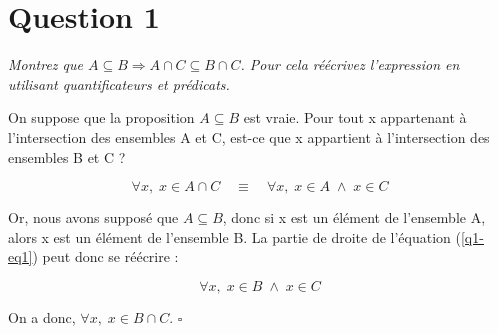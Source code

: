 \section*{Question 1}
\emph{Montrez que \( A \subseteq B \Rightarrow A \cap C \subseteq B \cap C\). Pour cela réécrivez l’expression en utilisant quantificateurs et prédicats.}

\bigskip

On suppose que la proposition \( A \subseteq B \) est vraie. Pour tout x appartenant à l’intersection des ensembles A et C, est-ce que x appartient à l’intersection des ensembles B et C ?

\begin{equation}
	\forall x, \; x \in A \cap C \quad \equiv \quad \forall x, \; x \in A \; \wedge \; x \in C
	\label{q1-eq1}
\end{equation}

Or, nous avons supposé que \( A \subseteq B \), donc si x est un élément de l’ensemble A, alors x est un élément de l’ensemble B. La partie de droite de l’équation (\ref{q1-eq1}) peut donc se réécrire :

\[\forall x, \; x \in B \; \wedge \; x \in C\]

On a donc, \(\forall x, \; x \in B \cap C\). \quad $\square$

%
